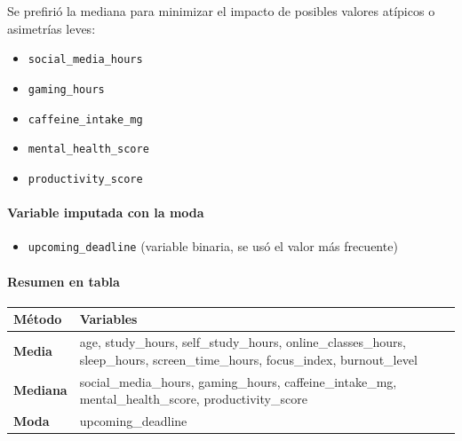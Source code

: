 \documentclass[11pt]{article}
\providecommand{\tightlist}{%
      \setlength{\itemsep}{0pt}\setlength{\parskip}{0pt}}
\begin{document}
Se prefirió la mediana para minimizar el impacto de posibles valores
atípicos o asimetrías leves:

\begin{itemize}
\tightlist
\item
  \texttt{social\_media\_hours}
\item
  \texttt{gaming\_hours}
\item
  \texttt{caffeine\_intake\_mg}
\item
  \texttt{mental\_health\_score}
\item
  \texttt{productivity\_score}
\end{itemize}

\paragraph{Variable imputada con la
moda}\label{variable-imputada-con-la-moda}

\begin{itemize}
\tightlist
\item
  \texttt{upcoming\_deadline} (variable binaria, se usó el valor más
  frecuente)
\end{itemize}

\paragraph{Resumen en tabla}\label{resumen-en-tabla}

{\def\LTcaptype{none} %
\begin{longtable}[]{@{}
  >{\raggedright\arraybackslash}p{}
  >{\raggedright\arraybackslash}p{}@{}}
\toprule\noalign{}
\begin{minipage}[b]{\linewidth}\raggedright
Método
\end{minipage} & \begin{minipage}[b]{\linewidth}\raggedright
Variables
\end{minipage} \\
\midrule\noalign{}
\endhead
\bottomrule\noalign{}
\endlastfoot
\textbf{Media} & age, study\_hours, self\_study\_hours,
online\_classes\_hours, sleep\_hours, screen\_time\_hours, focus\_index,
burnout\_level \\
\textbf{Mediana} & social\_media\_hours, gaming\_hours,
caffeine\_intake\_mg, mental\_health\_score, productivity\_score \\
\textbf{Moda} & upcoming\_deadline \\
\end{longtable}
}
\end{document}
